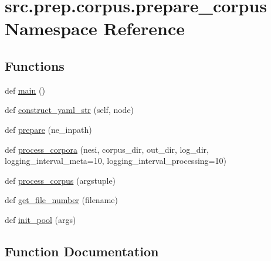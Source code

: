 \hypertarget{namespacesrc_1_1prep_1_1corpus_1_1prepare__corpus}{}\section{src.\+prep.\+corpus.\+prepare\+\_\+corpus Namespace Reference}
\label{namespacesrc_1_1prep_1_1corpus_1_1prepare__corpus}
\subsection*{Functions}
\begin{DoxyCompactItemize}
\item 
def \hyperlink{namespacesrc_1_1prep_1_1corpus_1_1prepare__corpus_a4eb546151d47799edbc7de2a8abff48a}{main} ()
\item 
def \hyperlink{namespacesrc_1_1prep_1_1corpus_1_1prepare__corpus_a956d94504adf6a560cd2ad3dd5572ff5}{construct\+\_\+yaml\+\_\+str} (self, node)
\item 
def \hyperlink{namespacesrc_1_1prep_1_1corpus_1_1prepare__corpus_a568330699d5f4fd98bd3ac1124902a01}{prepare} (ne\+\_\+inpath)
\item 
def \hyperlink{namespacesrc_1_1prep_1_1corpus_1_1prepare__corpus_ae449f9f0fac0dfb808519a64c9007fe9}{process\+\_\+corpora} (nesi, corpus\+\_\+dir, out\+\_\+dir, log\+\_\+dir, logging\+\_\+interval\+\_\+meta=10, logging\+\_\+interval\+\_\+processing=10)
\item 
def \hyperlink{namespacesrc_1_1prep_1_1corpus_1_1prepare__corpus_ac505c5273e307966fee76ab78d69d311}{process\+\_\+corpus} (argstuple)
\item 
def \hyperlink{namespacesrc_1_1prep_1_1corpus_1_1prepare__corpus_af575cf6adb35184992d08fcf2e97a98b}{get\+\_\+file\+\_\+number} (filename)
\item 
def \hyperlink{namespacesrc_1_1prep_1_1corpus_1_1prepare__corpus_a4ffa4f4b76ed87e43b33497aea2615c7}{init\+\_\+pool} (args)
\end{DoxyCompactItemize}


\subsection{Function Documentation}
